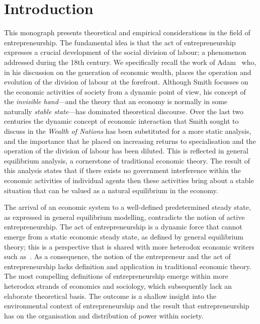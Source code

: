 \setcounter{page}{1} 
\chapter{Introduction}

This monograph presents theoretical and empirical considerations in the field of entrepreneurship. The fundamental idea is that the act of entrepreneurship expresses a crucial development of the social division of labour; a phenomenon addressed  during the 18th century. We specifically recall the work of Adam~\citet{Smith1776} who, in his discussion on the generation of economic wealth, places the operation and evolution of the division of labour at the forefront. Although Smith focusses on the economic activities of society from a dynamic point of view, his concept of the \emph{invisible hand}---and the theory that an economy is normally in some naturally \emph{stable state}---has dominated theoretical discourse. Over the last two centuries the dynamic concept of economic interaction that Smith sought to discuss in the \emph{Wealth of Nations} has been substituted for a more static analysis, and the importance that he placed on increasing returns to specialisation and the operation of the division of labour has been diluted. This is reflected in general equilibrium analysis, a cornerstone of traditional economic theory. The result of this analysis states that if there exists no government interference within the economic activities of individual agents then these activities bring about a stable situation that can be valued as a natural equilibrium in the economy.

The arrival of an economic system to a well-defined predetermined steady state, as expressed in general equilibrium modelling, contradicts the notion of active entrepreneurship. The act of entrepreneurship is a dynamic force that cannot emerge from a static economic steady state, as defined by general equilibrium theory; this is a perspective that is shared with more heterodox economic writers such as~\citet{Schumpeter1942}. As a consequence, the notion of the entrepreneur and the act of entrepreneurship lacks definition and application in traditional economic theory. The most compelling definitions of entrepreneurship emerge within more heterodox strands of economics and sociology, which subsequently lack an elaborate theoretical basis. The outcome is a shallow insight into the environmental context of entrepreneurship and the result that entrepreneurship has on the organisation and distribution of power within society.


